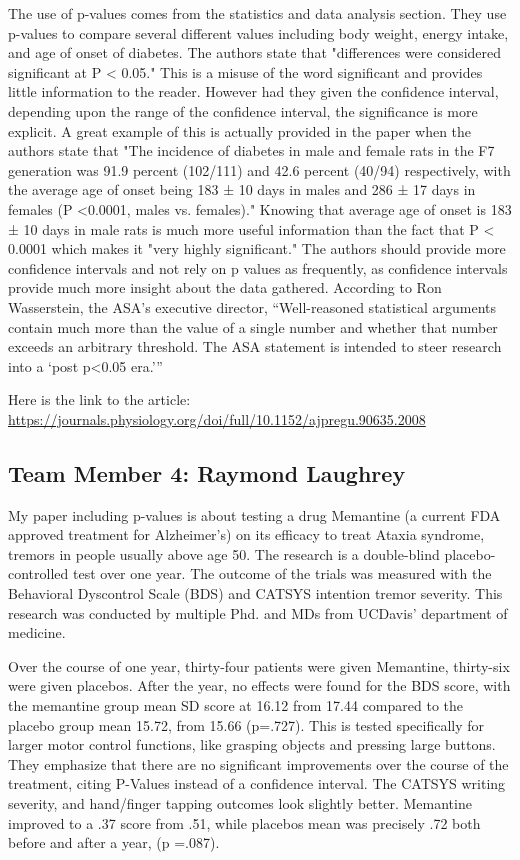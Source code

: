 \documentclass{article}
\numberwithin{equation}{section}
\begin{document}
The use of p-values comes from the statistics and data analysis section.  They use p-values to compare several different values including body weight, energy intake, and age of onset of diabetes. The authors state that "differences were considered significant at P < 0.05." This is a misuse of the word significant and provides little information to the reader. However had they given the confidence interval, depending upon the range of the confidence interval, the significance is more explicit. A great example of this is actually provided in the paper when the authors state that "The incidence of diabetes in male and female rats in the F7 generation was 91.9 percent (102/111) and 42.6 percent (40/94) respectively, with the average age of onset being 183 ± 10 days in males and 286 ± 17 days in females     (P <0.0001, males vs. females)." Knowing that average age of onset is 183 ± 10 days in male rats is much more useful information than the fact that     P < 0.0001 which makes it "very highly significant."  The authors should provide more confidence intervals and not rely on p values as frequently, as confidence intervals provide much more insight about the data gathered. According to Ron Wasserstein, the ASA’s executive director, “Well-reasoned statistical arguments contain much more than the value of a single number and whether that number exceeds an arbitrary threshold. The ASA statement is intended to steer research into a ‘post p<0.05 era.’”

Here is the link to the article: \url{https://journals.physiology.org/doi/full/10.1152/ajpregu.90635.2008}
\subsection{Team Member 4: Raymond Laughrey}

My paper including p-values is about testing a drug Memantine (a current FDA approved treatment for Alzheimer’s) on its efficacy to treat Ataxia syndrome, tremors in people usually above age 50. The research is a double-blind placebo-controlled test over one year. The outcome of the trials was measured with the Behavioral Dyscontrol Scale (BDS) and CATSYS intention tremor severity. This research was conducted by multiple Phd. and MDs from UCDavis’ department of medicine.

Over the course of one year, thirty-four patients were given Memantine, thirty-six were given placebos. After the year, no effects were found for the BDS score, with the memantine group mean SD score at 16.12 from 17.44 compared to the placebo group mean 15.72, from 15.66 (p=.727). This is tested specifically for larger motor control functions, like grasping objects and pressing large buttons. They emphasize that there are no significant improvements over the course of the treatment, citing P-Values instead of a confidence interval. The CATSYS writing severity, and hand/finger tapping outcomes look slightly better. Memantine improved to a .37 score from .51, while placebos mean was precisely .72 both before and after a year, (p =.087).
\end{document}
